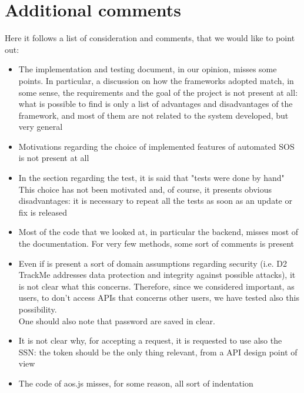 \section{Additional comments}
Here it follows a list of consideration and comments, that we would like to point out:
\begin{itemize}
\item The implementation and testing document, in our opinion, misses some points. 
In particular, a discussion on how the frameworks adopted match, in some sense, the requirements and the goal of the project 
is not present at all: what is possible to find is only a list of advantages and disadvantages of the framework, and most of them are not
related to the system developed, but very general
\item Motivations regarding the choice of implemented features of automated SOS is not present at all
\item In the section regarding the test, it is said that "tests were done by hand"
This choice has not been motivated and, of course, it presents obvious disadvantages: it is necessary to repeat all the tests as soon as
an update or fix is released
\item Most of the code that we looked at, in particular the backend, misses most of the documentation. For very few methods, some sort
of comments is present
\item Even if is present a sort of domain assumptions regarding security (i.e. D2 TrackMe addresses data protection and integrity against
possible attacks), it is not clear what this concerns. Therefore, since we considered important, as users, to don't access APIs that
concerns other users, we have tested also this possibility. \\
One should also note that password are saved in clear.
\item It is not clear why, for accepting a request, it is requested to use also the SSN: the token should be the only thing relevant, from a
API design point of view
\item The code of aos.js misses, for some reason, all sort of indentation
\end{itemize}